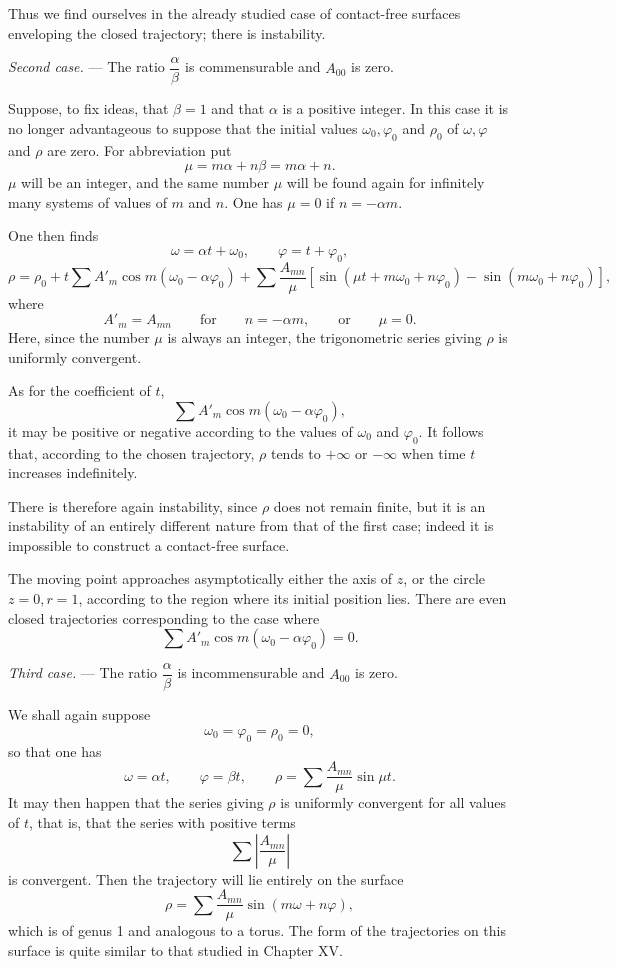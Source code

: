 \documentclass[11pt]{article}
\begin{document}
Thus we find ourselves in the already studied case of contact-free surfaces enveloping the closed trajectory; there is instability.

\emph{Second case.} — The ratio $\dfrac{\alpha}{\beta}$ is commensurable and $A_{00}$ is zero.

Suppose, to fix ideas, that $\beta=1$ and that $\alpha$ is a positive integer. In this case it is no longer advantageous to suppose that the initial values $\omega_0,\varphi_0$ and $\rho_0$ of $\omega,\varphi$ and $\rho$ are zero. For abbreviation put
\[
\mu=m\alpha+n\beta=m\alpha+n.
\]
$\mu$ will be an integer, and the same number $\mu$ will be found again for infinitely many systems of values of $m$ and $n$. One has $\mu=0$ if $n=-\alpha m$.

One then finds
\[
\omega=\alpha t+\omega_0,
\qquad
\varphi=t+\varphi_0,
\]
\[
\rho=\rho_0+t\sum A'_m\cos m(\omega_0-\alpha\varphi_0)
+\sum \frac{A_{mn}}{\mu}\left[\sin(\mu t+m\omega_0+n\varphi_0)-\sin(m\omega_0+n\varphi_0)\right],
\]
where
\[
A'_m=A_{mn}
\qquad \text{for}\qquad n=-\alpha m,
\qquad \text{or}\qquad \mu=0.
\]
Here, since the number $\mu$ is always an integer, the trigonometric series giving $\rho$ is uniformly convergent.

As for the coefficient of $t$,
\[
\sum A'_m\cos m(\omega_0-\alpha\varphi_0),
\]
it may be positive or negative according to the values of $\omega_0$ and $\varphi_0$. It follows that, according to the chosen trajectory, $\rho$ tends to $+\infty$ or $-\infty$ when time $t$ increases indefinitely.

There is therefore again instability, since $\rho$ does not remain finite, but it is an instability of an entirely different nature from that of the first case; indeed it is impossible to construct a contact-free surface.

The moving point approaches asymptotically either the axis of $z$, or the circle $z=0,r=1$, according to the region where its initial position lies. There are even closed trajectories corresponding to the case where
\[
\sum A'_m\cos m(\omega_0-\alpha\varphi_0)=0.
\]

\emph{Third case.} — The ratio $\dfrac{\alpha}{\beta}$ is incommensurable and $A_{00}$ is zero.

We shall again suppose
\[
\omega_0=\varphi_0=\rho_0=0,
\]
so that one has
\[
\omega=\alpha t,
\qquad
\varphi=\beta t,
\qquad
\rho=\sum \frac{A_{mn}}{\mu}\sin\mu t.
\]
It may then happen that the series giving $\rho$ is uniformly convergent for all values of $t$, that is, that the series with positive terms
\begin{equation}
\sum \left|\frac{A_{mn}}{\mu}\right|
\tag{9}
\end{equation}
is convergent. Then the trajectory will lie entirely on the surface
\[
\rho=\sum \frac{A_{mn}}{\mu}\sin(m\omega+n\varphi),
\]
which is of genus 1 and analogous to a torus. The form of the trajectories on this surface is quite similar to that studied in Chapter XV.
\end{document}
